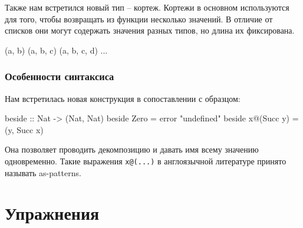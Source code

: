 Также нам встретился новый тип -- кортеж. Кортежи в основном
используются для того, чтобы возвращать из функции 
несколько значений. В отличие от списков они могут 
содержать значения разных типов, но длина их фиксирована.

\begin{code}
(a, b)
(a, b, c)
(a, b, c, d)
...
\end{code}


\subsubsection{Особенности синтаксиса}

Нам встретилась новая конструкция в сопоставлении с образцом:

\begin{code}
beside :: Nat -> (Nat, Nat)
beside  Zero       = error "undefined"
beside  x@(Succ y) = (y, Succ x)
\end{code}

Она позволяет проводить декомпозицию и давать имя 
всему значению одновременно. Такие выражения \verb!x@(...)!
в англоязычной литературе принято называть as-patterns.

\section{Упражнения}

